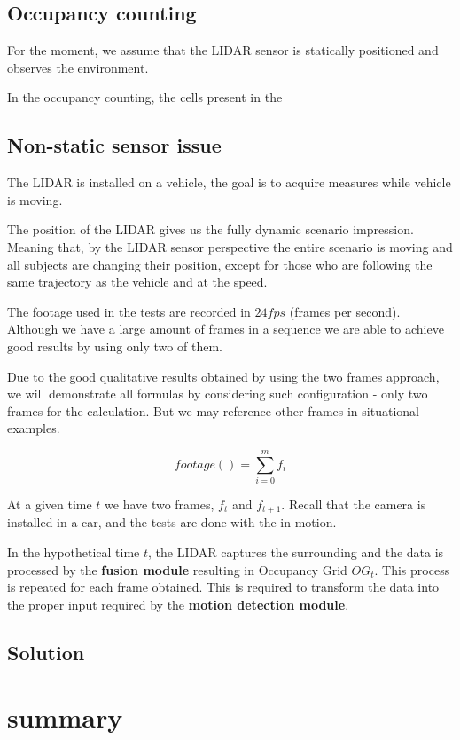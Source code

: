 \subsection{Occupancy counting}

For the moment, we assume that the LIDAR sensor is statically positioned and observes the environment.

In the occupancy counting, the cells present in the 


\subsection{Non-static sensor issue}

The LIDAR is installed on a vehicle, the goal is to acquire measures while vehicle is moving. 

The position of the LIDAR gives us the fully dynamic scenario impression. Meaning that, by the LIDAR sensor perspective the entire scenario is moving and all subjects are changing their position, except for those who are following the same trajectory as the vehicle and at the speed.

The footage used in the tests are recorded in $24fps$ (frames per second). Although we have a large amount of frames in a sequence we are able to achieve good results by using only two of them. 

Due to the good qualitative results obtained by using the two frames approach, we will demonstrate all formulas by considering such configuration - only two frames for the calculation. But we may reference other frames in situational examples.

\begin{equation}
footage()=\sum_{i=0}^{m} f_i
\end{equation}

At a given time $t$ we have two frames, $f_{t}$ and $f_{t+1}$. Recall that the camera is installed in a car, and the tests are done with the in motion. 

In the hypothetical time $t$, the LIDAR captures the surrounding and the data is processed by the \textbf{fusion module} resulting in Occupancy Grid $OG_t$. This process is repeated for each frame obtained. This is required to transform the data into the proper input required by the \textbf{motion detection module}.


\subsection{Solution}


\section{summary}


